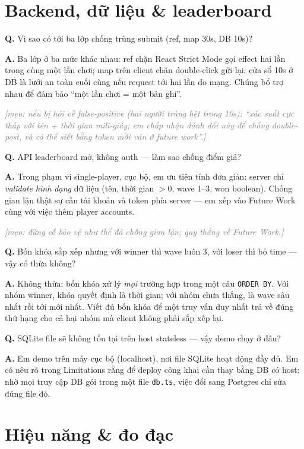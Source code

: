 \documentclass[12pt,a4paper]{article}
\newcommand{\QA}[2]{%
  \par\medskip\noindent\textbf{\textcolor{blue!60!black}{Q.}} #1\par
  \smallskip\noindent\textbf{\textcolor{green!45!black}{A.}} #2\par}
\newcommand{\tip}[1]{\par\smallskip\noindent%
  \textit{\textcolor{gray}{[mẹo: #1]}}\par}
\begin{document}
\section{Backend, dữ liệu \& leaderboard}

\QA{Vì sao có tới ba lớp chống trùng submit (ref, map 30s, DB 10s)?}
{Ba lớp ở ba mức khác nhau: ref chặn React Strict Mode gọi effect hai lần trong
cùng một lần chơi; map trên client chặn double-click gửi lại; cửa sổ 10s ở DB là
lưới an toàn cuối cùng nếu request tới hai lần do mạng. Chúng bổ trợ nhau để đảm
bảo ``một lần chơi = một bản ghi''.}
\tip{nếu bị hỏi về false-positive (hai người trùng hệt trong 10s): ``xác suất cực
thấp với tên + thời gian mili-giây; em chấp nhận đánh đổi này để chống double-post,
và có thể siết bằng token mỗi ván ở future work''.}

\QA{API leaderboard mở, không auth --- làm sao chống điểm giả?}
{Trong phạm vi single-player, cục bộ, em ưu tiên tính đơn giản: server chỉ
\emph{validate hình dạng} dữ liệu (tên, thời gian $>0$, wave 1--3, won boolean).
Chống gian lận thật sự cần tài khoản và token phía server --- em xếp vào Future
Work cùng với việc thêm player accounts.}
\tip{đừng cố bảo vệ như thể đã chống gian lận; quy thẳng về Future Work.}

\QA{Bốn khóa sắp xếp nhưng với winner thì wave luôn 3, với loser thì bỏ time ---
vậy có thừa không?}
{Không thừa: bốn khóa xử lý \emph{mọi} trường hợp trong một câu \texttt{ORDER BY}.
Với nhóm winner, khóa quyết định là thời gian; với nhóm chưa thắng, là wave sâu
nhất rồi tới mới nhất. Viết đủ bốn khóa để một truy vấn duy nhất trả về đúng thứ
hạng cho cả hai nhóm mà client không phải sắp xếp lại.}

\QA{SQLite file sẽ không tồn tại trên host stateless --- vậy demo chạy ở đâu?}
{Em demo trên máy cục bộ (localhost), nơi file SQLite hoạt động đầy đủ. Em có nêu
rõ trong Limitations rằng để deploy công khai cần thay bằng DB có host; nhờ mọi
truy cập DB gói trong một file \texttt{db.ts}, việc đổi sang Postgres chỉ sửa
đúng file đó.}

\section{Hiệu năng \& đo đạc}
\end{document}
